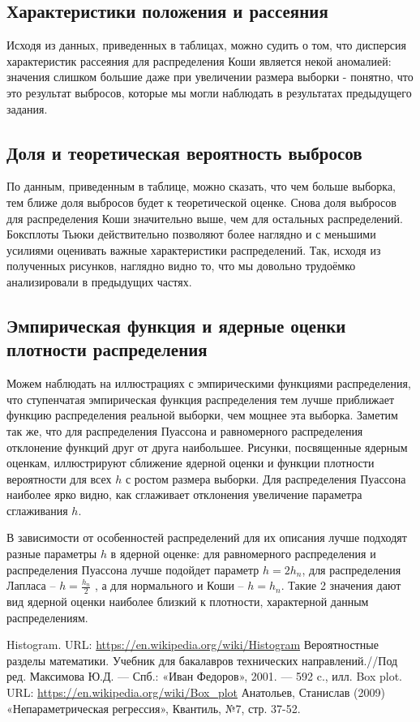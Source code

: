 \documentclass[12pt]{article}
\begin{document}
\subsection{Характеристики положения и рассеяния}
Исходя из данных, приведенных в таблицах, можно судить о том,
что дисперсия характеристик рассеяния для распределения Коши
является некой аномалией: значения слишком большие даже при
увеличении размера выборки - понятно, что это результат выбросов, 
которые мы могли наблюдать в результатах предыдущего задания.



\subsection{Доля и теоретическая вероятность выбросов}
По данным, приведенным в таблице, можно сказать, что чем больше выборка,
тем ближе доля выбросов будет к теоретической оценке. Снова доля выбросов для
распределения Коши значительно выше, чем для остальных распределений. 
Боксплоты Тьюки действительно позволяют более наглядно и с меньшими 
усилиями оценивать важные характеристики распределений. 
Так, исходя из полученных рисунков, наглядно видно то, 
что мы довольно трудоёмко анализировали в предыдущих частях.

\subsection{Эмпирическая функция и ядерные оценки плотности распределения}
Можем наблюдать на иллюстрациях с эмпирическими функциями распределения, 
что ступенчатая эмпирическая функция распределения тем лучше приближает 
функцию распределения реальной выборки, чем мощнее эта выборка. 
Заметим так же, что для распределения Пуассона и равномерного распределения 
отклонение функций  друг от друга наибольшее.
Рисунки, посвященные ядерным оценкам, иллюстрируют сближение ядерной оценки и
функции плотности вероятности для всех $h$ с ростом размера выборки. 
Для распределения Пуассона наиболее ярко видно, как сглаживает отклонения увеличение
параметра сглаживания $h$.

В зависимости от особенностей распределений для их описания лучше подходят разные параметры
$h$ в ядерной оценке: для равномерного распределения и распределения Пуассона лучше подойдет 
параметр $h = 2h_n$, для распределения Лапласа – $h = \frac{h_n}{2}$ , а для нормального и Коши – $h = h_n$. Такие 2
значения дают вид ядерной оценки наиболее близкий к плотности, характерной данным распределениям.



\clearpage
{}


\begin{thebibliography}{4}
    Histogram. URL: \url{https://en.wikipedia.org/wiki/Histogram}
    Вероятностные разделы математики. Учебник для бакалавров технических направлений.//Под ред. Максимова Ю.Д. --- Спб.: «Иван Федоров», 2001. --- 592 c., илл.
    Box plot. URL: \url{https://en.wikipedia.org/wiki/Box_plot}
    Анатольев, Станислав (2009) «Непараметрическая регрессия», Квантиль, №7, стр. 37-52.
\end{thebibliography}
\end{document}
